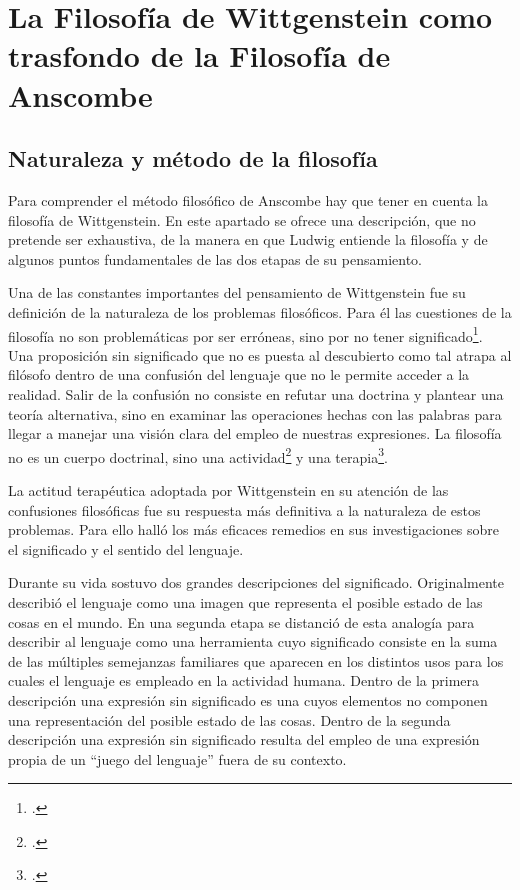 \section{La Filosofía de Wittgenstein como trasfondo de la Filosofía de Anscombe}

\subsection{Naturaleza y método de la filosofía}

Para comprender el método filosófico de Anscombe hay que tener en cuenta la filosofía de Wittgenstein. En este apartado se ofrece una descripción, que no pretende ser exhaustiva, de la manera en que Ludwig entiende la filosofía y de algunos puntos fundamentales de las dos etapas de su pensamiento.

Una de las constantes importantes del pensamiento de Wittgenstein fue su definición de la naturaleza de los problemas filosóficos. Para él las cuestiones de la filosofía no son problemáticas por ser erróneas, sino por no tener significado\footcite[Cf.][\S4.003]{wittgenstein1922tractatuses}. Una proposición sin significado que no es puesta al descubierto como tal atrapa al filósofo dentro de una confusión del lenguaje que no le permite acceder a la realidad. Salir de la confusión no consiste en refutar una doctrina y plantear una teoría alternativa, sino en examinar las operaciones hechas con las palabras para llegar a manejar una visión clara del empleo de nuestras expresiones. La filosofía no es un cuerpo doctrinal, sino una actividad\footcite[Cf.][\S4.112]{wittgenstein1922tractatuses} y una terapia\footcite[Cf.][\S133]{wittgenstein1953phiinv}.

La actitud terapéutica adoptada por Wittgenstein en su atención de las confusiones filosóficas fue su respuesta más definitiva a la naturaleza de estos problemas. Para ello halló los más eficaces remedios en sus investigaciones sobre el significado y el sentido del lenguaje.

Durante su vida sostuvo dos grandes descripciones del significado. Originalmente describió el lenguaje como una imagen que representa el posible estado de las cosas en el mundo. En una segunda etapa se distanció de esta analogía para describir al lenguaje como una herramienta cuyo significado consiste en la suma de las múltiples semejanzas familiares que aparecen en los distintos usos para los cuales el lenguaje es empleado en la actividad humana. Dentro de la primera descripción una expresión sin significado es una cuyos elementos no componen una representación del posible estado de las cosas. Dentro de la segunda descripción una expresión sin significado resulta del empleo de una expresión propia de un ``juego del lenguaje'' fuera de su contexto.

